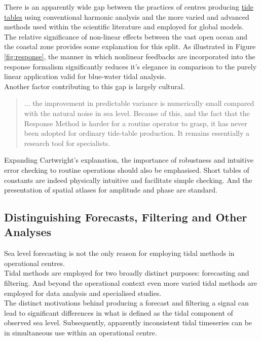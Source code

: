 There is an apparently wide gap between the practices of centres producing \underline{tide tables} using conventional harmonic analysis and the more varied and advanced methods used within the scientific literature and employed for global models.\\
The relative significance of non-linear effects between the vast open ocean and the coastal zone provides some explanation for this split.  As illustrated in Figure \ref{fig:response}, the manner in which nonlinear feedbacks are incorporated into the response formalism significantly reduces it's elegance in comparison to the purely linear application valid for blue-water tidal analysis.\\
Another factor contributing to this gap is largely cultural.
\begin{quotation}
$\dots$ the improvement in predictable variance is numerically small compared with the natural noise in sea level.   Because of this, and the fact that the Response Method is harder for a routine operator to grasp, it has never been adopted for ordinary tide-table production. It remains essentially a research tool for specialists. \citep[pp 198]{Cartwright:2000tt} 
\end{quotation}
Expanding Cartwright's explanation, the importance of robustness and intuitive error checking to routine operations should also be emphasised.  Short tables of constants are indeed physically intuitive and facilitate simple checking.   And the presentation of spatial atlases for amplitude and phase are standard.





\subsection{Distinguishing Forecasts, Filtering and Other Analyses}

Sea level forecasting is not the only reason for employing tidal methods in operational centres.\\
Tidal methods are employed for two broadly distinct purposes: forecasting and filtering.  And beyond the operational context even more varied tidal methods are employed for data analysis and specialised studies.\\

The distinct motivations behind producing a forecast and filtering a signal can lead to significant differences in what is defined as the tidal component of observed sea level.   Subsequently, apparently inconsistent tidal timeseries can be in simultaneous use within an operational centre.




